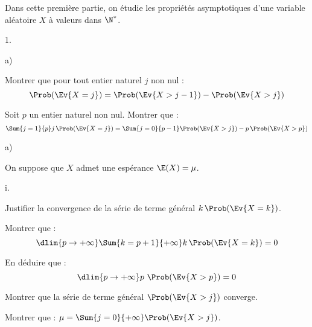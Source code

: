 \noindent
Dans cette première partie, on étudie les propriétés asymptotiques
d'une variable aléatoire $X$ à valeurs dans $\N^*$.
\begin{noliste}{1.}
  \setlength{\itemsep}{2mm}
\item 
  \begin{noliste}{a)}
  \item Montrer que pour tout entier naturel $j$ non nul : 
    \[
    \Prob(\Ev{X=j}) = \Prob(\Ev{X > j-1}) - \Prob(\Ev{X>j})
    \]
    
    



    
  \item Soit $p$ un entier naturel non nul. Montrer que :
    \[
    \Sum{j=1}{p} j \, \Prob(\Ev{X=j})= \Sum{j=0}{p-1} 
    \Prob(\Ev{X>j})-p \, \Prob(\Ev{X>p})
    \]
    
    
\end{noliste}




\item 
  \begin{noliste}{a)}
  \item On suppose que $X$ admet une espérance $\E(X)= \mu$.
    \begin{nonoliste}{i.}
    \item Justifier la convergence de la série de terme général $k \,
      \Prob(\Ev{X=k})$.
      
      

    \item Montrer que : 
      \[
      \dlim{p \to +\infty} \Sum{k=p+1}{+\infty} k \, \Prob(\Ev{X=k})=0
      \]
      
      




    \item En déduire que :
      \[
      \dlim{p \to +\infty} p \ \Prob(\Ev{X>p}) = 0
      \]

      

    \item Montrer que la série de terme général $\Prob(\Ev{X>j})$
      converge.

      




  \item Montrer que : $\mu= \Sum{j=0}{+\infty} \Prob(\Ev{X >j})$.

      
    \end{nonoliste}
    

\end{noliste}
\end{noliste}
